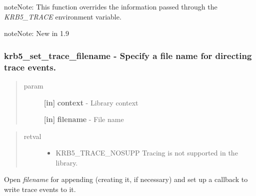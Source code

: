 \documentclass[letterpaper,10pt,english]{sphinxmanual}
\begin{document}
\begin{notice}{note}{Note:}
This function overrides the information passed through the \emph{KRB5\_TRACE} environment variable.
\end{notice}

\begin{notice}{note}{Note:}
New in 1.9
\end{notice}


\subsubsection{krb5\_set\_trace\_filename -  Specify a file name for directing trace events.}
\label{appdev/refs/api/krb5_set_trace_filename:krb5-set-trace-filename-specify-a-file-name-for-directing-trace-events}\label{appdev/refs/api/krb5_set_trace_filename::doc}

\begin{fulllineitems}
\label{appdev/refs/api/krb5_set_trace_filename:krb5_set_trace_filename}
\end{fulllineitems}

\begin{quote}\begin{description}
\item[{param}] \leavevmode
\textbf{{[}in{]}} \textbf{context} - Library context

\textbf{{[}in{]}} \textbf{filename} - File name

\end{description}\end{quote}
\begin{quote}\begin{description}
\item[{retval}] \leavevmode\begin{itemize}
\item {} 
KRB5\_TRACE\_NOSUPP   Tracing is not supported in the library.

\end{itemize}

\end{description}\end{quote}

Open \emph{filename} for appending (creating it, if necessary) and set up a callback to write trace events to it.
\end{document}
